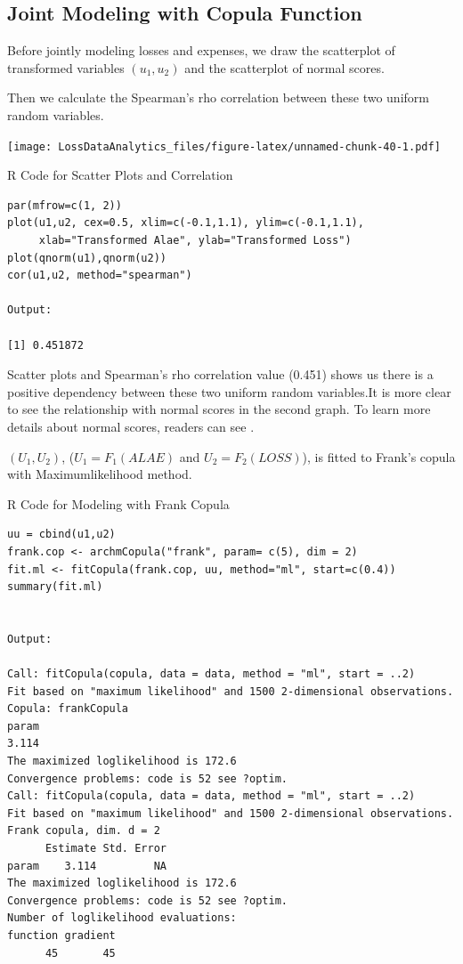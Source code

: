 \documentclass[]{book}
\theoremstyle{definition}
\theoremstyle{definition}
\theoremstyle{definition}
\theoremstyle{remark}
\begin{document}
\subsection{Joint Modeling with Copula
Function}\label{joint-modeling-with-copula-function}

Before jointly modeling losses and expenses, we draw the scatterplot of
transformed variables \((u_1, u_2)\) and the scatterplot of normal
scores.

Then we calculate the Spearman's rho correlation between these two
uniform random variables.

\texttt{[image: LossDataAnalytics\_files/figure-latex/unnamed-chunk-40-1.pdf]}

R Code for Scatter Plots and Correlation

\hypertarget{display.Cor.2}{}
\begin{verbatim}
par(mfrow=c(1, 2))
plot(u1,u2, cex=0.5, xlim=c(-0.1,1.1), ylim=c(-0.1,1.1),
     xlab="Transformed Alae", ylab="Transformed Loss")
plot(qnorm(u1),qnorm(u2))
cor(u1,u2, method="spearman")

Output: 

[1] 0.451872
\end{verbatim}

Scatter plots and Spearman's rho correlation value (0.451) shows us
there is a positive dependency between these two uniform random
variables.It is more clear to see the relationship with normal scores in
the second graph. To learn more details about normal scores, readers can
see \citep{joe2014dependence}.

\((U_1, U_2)\), (\(U_1 = F_1(ALAE)\) and \(U_2=F_2(LOSS)\)), is fitted
to Frank's copula with Maximumlikelihood method.

R Code for Modeling with Frank Copula

\hypertarget{display.FrankCopula.2}{}
\begin{verbatim}
uu = cbind(u1,u2) 
frank.cop <- archmCopula("frank", param= c(5), dim = 2)
fit.ml <- fitCopula(frank.cop, uu, method="ml", start=c(0.4))
summary(fit.ml)


Output: 

Call: fitCopula(copula, data = data, method = "ml", start = ..2)
Fit based on "maximum likelihood" and 1500 2-dimensional observations.
Copula: frankCopula 
param 
3.114 
The maximized loglikelihood is 172.6 
Convergence problems: code is 52 see ?optim.
Call: fitCopula(copula, data = data, method = "ml", start = ..2)
Fit based on "maximum likelihood" and 1500 2-dimensional observations.
Frank copula, dim. d = 2 
      Estimate Std. Error
param    3.114         NA
The maximized loglikelihood is 172.6 
Convergence problems: code is 52 see ?optim.
Number of loglikelihood evaluations:
function gradient 
      45       45 
\end{verbatim}
\end{document}
